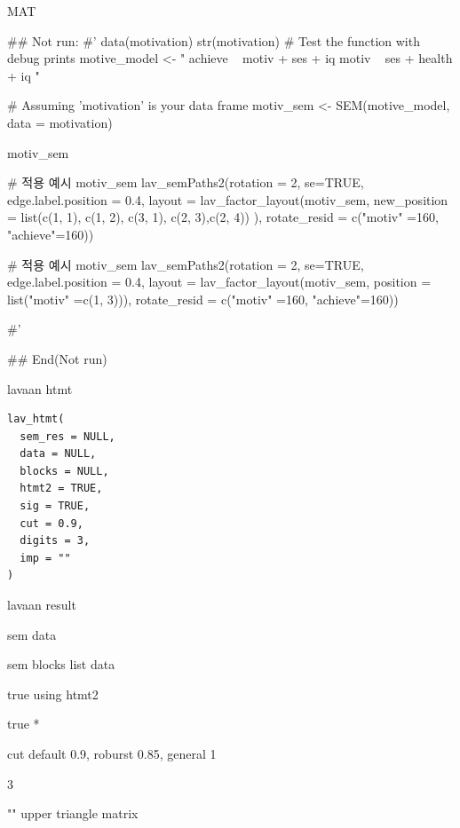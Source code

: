 \documentclass[a4paper]{book}
\begin{document}
%
\begin{Value}
MAT
\end{Value}
%
\begin{Examples}
\begin{ExampleCode}

\#\# Not run: 
#'
data(motivation)
str(motivation)
# Test the function with debug prints
motive_model <- "
achieve ~ motiv + ses + iq
motiv ~ ses + health + iq
"

# Assuming 'motivation' is your data frame
motiv_sem <- SEM(motive_model, data = motivation)

motiv_sem%

# 적용 예시
motiv_sem %
  lav_semPaths2(rotation = 2, se=TRUE,
  edge.label.position = 0.4,
                layout =
                lav_factor_layout(motiv_sem,
       new_position = list(c(1, 1), c(1, 2),
       c(3, 1), c(2, 3),c(2, 4)) ),
            rotate_resid = c("motiv" =160, "achieve"=160))


# 적용 예시
motiv_sem %
  lav_semPaths2(rotation = 2, se=TRUE,
  edge.label.position = 0.4,
                layout = lav_factor_layout(motiv_sem,
                                           position = list("motiv" =c(1, 3))),
                rotate_resid = c("motiv" =160, "achieve"=160))

#'

## End(Not run)

\end{ExampleCode}
\end{Examples}
%
\begin{Description}
lavaan htmt
\end{Description}
%
\begin{Usage}
\begin{verbatim}
lav_htmt(
  sem_res = NULL,
  data = NULL,
  blocks = NULL,
  htmt2 = TRUE,
  sig = TRUE,
  cut = 0.9,
  digits = 3,
  imp = ""
)
\end{verbatim}
\end{Usage}
%
\begin{Arguments}
\begin{ldescription}
\item[\code{sem\_res}] lavaan result

\item[\code{data}] sem data

\item[\code{blocks}] sem blocks list data

\item[\code{htmt2}] true using htmt2

\item[\code{sig}] true *

\item[\code{cut}] cut default 0.9, roburst 0.85, general 1

\item[\code{digits}] 3

\item[\code{imp}] "" upper triangle matrix
\end{ldescription}
\end{Arguments}
\end{document}
